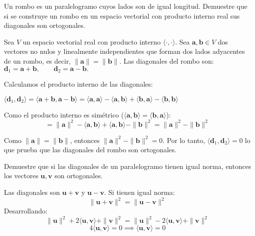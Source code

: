 \begin{prob}
Un rombo es un paralelogramo cuyos lados son de igual longitud. Demuestre que si se construye un rombo en un espacio vectorial con producto interno real sus diagonales son ortogonales.
\begin{myproof}
Sea $V$ un espacio vectorial real con producto interno $\langle \cdot, \cdot \rangle$. Sea $\mathbf{a}, \mathbf{b} \in V$ dos vectores no nulos y linealmente independientes que forman dos lados adyacentes de un rombo, es decir, $\|\mathbf{a}\| = \|\mathbf{b}\|$. Las diagonales del rombo son: \(
\mathbf{d}_1 = \mathbf{a} + \mathbf{b}, \qquad \mathbf{d}_2 = \mathbf{a} - \mathbf{b}.
\)

Calculamos el producto interno de las diagonales: 

\(
\langle \mathbf{d}_1, \mathbf{d}_2 \rangle = \langle \mathbf{a} + \mathbf{b}, \mathbf{a} - \mathbf{b} \rangle = \langle \mathbf{a}, \mathbf{a} \rangle - \langle \mathbf{a}, \mathbf{b} \rangle + \langle \mathbf{b}, \mathbf{a} \rangle - \langle \mathbf{b}, \mathbf{b} \rangle
\)

Como el producto interno es simétrico ($\langle \mathbf{a}, \mathbf{b} \rangle = \langle \mathbf{b}, \mathbf{a} \rangle$):
\[
= \|\mathbf{a}\|^2 - \langle \mathbf{a}, \mathbf{b} \rangle + \langle \mathbf{a}, \mathbf{b} \rangle - \|\mathbf{b}\|^2
= \|\mathbf{a}\|^2 - \|\mathbf{b}\|^2
\]

Como $\|\mathbf{a}\| = \|\mathbf{b}\|$, entonces $\|\mathbf{a}\|^2 - \|\mathbf{b}\|^2 = 0$. Por lo tanto, \(\langle \mathbf{d}_1, \mathbf{d}_2 \rangle = 0 \) lo que prueba que las diagonales del rombo son ortogonales.
\end{myproof}
\end{prob}

\begin{prob}
Demuestre que si las diagonales de un paralelogramo tienen igual norma, entonces los vectores \( \mathbf{u}, \mathbf{v} \) son ortogonales.
\begin{myproof}
Las diagonales son \( \mathbf{u} + \mathbf{v} \) y \( \mathbf{u} - \mathbf{v} \). Si tienen igual norma:
\[
\|\mathbf{u} + \mathbf{v}\|^2 = \|\mathbf{u} - \mathbf{v}\|^2
\]
Desarrollando:
\[
\|\mathbf{u}\|^2 + 2\langle \mathbf{u}, \mathbf{v} \rangle + \|\mathbf{v}\|^2 = \|\mathbf{u}\|^2 - 2\langle \mathbf{u}, \mathbf{v} \rangle + \|\mathbf{v}\|^2
\]
\[
4\langle \mathbf{u}, \mathbf{v} \rangle = 0 \implies \langle \mathbf{u}, \mathbf{v} \rangle = 0
\]
\end{myproof}
\end{prob}



